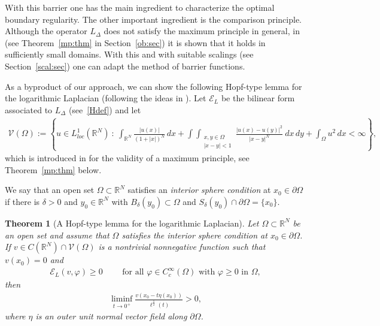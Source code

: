 \documentclass[11pt]{article}
\newcommand{\R}{\mathbb{R}}
\numberwithin{equation}{section}
\newtheorem{theorem}{Theorem}[section]
\newcommand{\cE}{{\mathcal E}}
\begin{document}
With this barrier one has the main ingredient to characterize the optimal boundary regularity. The other important ingredient is the comparison principle.  Although the operator $L_\Delta$ does not satisfy the maximum principle in general, in \cite[Corollary 1.9]{CW19} (see Theorem~\ref{mp:thm} in Section~\ref{ob:sec}) it is shown that it holds in sufficiently small domains. With this and with suitable scalings (see Section~\ref{scal:sec}) one can adapt the method of barrier functions.

As a byproduct of our approach, we can show the following Hopf-type lemma for the logarithmic Laplacian (following the ideas in \cite{JF}). Let  $\cE_L$ be the bilinear form associated to $L_\Delta$ (see~\eqref{Hdef}) and let 
\begin{align}\label{Vspace:def}
{\mathcal V}(\Omega):=\left\{ u\in L^1_{loc}(\R^N)\::\:
\int_{\R^N}\frac{|u(x)|}{(1+|x|)^{N}}\, dx+\int\int_{\substack{{x,y\in\Omega}\\{|x-y|<1}}}\frac{|u(x)-u(y)|^2}{|x-y|^N}\ dx\, dy+\int_\Omega u^2\, dx<\infty
\right\},
\end{align}
which is introduced in \cite{CW19} for the validity of a maximum principle, see Theorem~\ref{mp:thm} below.  

We say that an open set $\Omega\subset \R^N$ satisfies an \emph{interior sphere condition} at $x_0\in\partial \Omega$ if there is $\delta>0$ and $y_0\in \R^N$ with $B_{\delta}(y_0)\subset \Omega$ and $S_{\delta}(y_0) \cap \partial \Omega = \{ x_0 \}$. 

\begin{theorem}[A Hopf-type lemma for the logarithmic Laplacian]\label{strong:mp}
Let $\Omega\subset \R^N$ be an open set and assume that $\Omega$ satisfies the interior sphere condition at $x_0\in \partial \Omega$.  If $v\in{C}(\mathbb{R}^{N})\cap {\mathcal V}(\Omega)$ is a nontrivial nonnegative function such that $v(x_0)=0$ and 
\begin{align*}
\cE_L(v, \varphi) \geq 0\qquad \text{ for all $\varphi \in C^\infty_c(\Omega)$ with $\varphi \geq 0$ in $\Omega$},
\end{align*}
then
\begin{align}\label{hopf:ineq}
\liminf_{t\to 0^+} \frac{v(x_0-t\eta(x_0))}{\ell^\frac{1}{2}(t)}>0,
\end{align}
where $\eta$ is an outer unit normal vector field along $\partial \Omega$.
\end{theorem}
\end{document}

